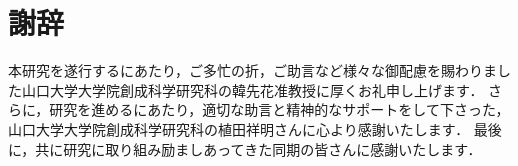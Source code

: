 \chapter*{謝辞}
本研究を遂行するにあたり，ご多忙の折，ご助言など様々な御配慮を賜わりました山口大学大学院創成科学研究科の韓先花准教授に厚くお礼申し上げます．
さらに，研究を進めるにあたり，適切な助言と精神的なサポートをして下さった，山口大学大学院創成科学研究科の植田祥明さんに心より感謝いたします．
最後に，共に研究に取り組み励ましあってきた同期の皆さんに感謝いたします．
\newpage
